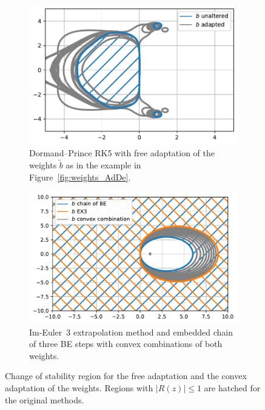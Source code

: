 \documentclass[a4paper]{article}
\numberwithin{equation}{section}
\theoremstyle{plain}
\theoremstyle{definition}
\numberwithin{theorem}{section}
\newcommand{\1}{\mathbbm{1}}
\newcommand{\bt}{\tilde{b}}
\begin{document}
\begin{figure}
     \centering
     \begin{subfigure}[b]{0.45\textwidth}
         \centering
         \includegraphics[width=\textwidth]{plots/stab_dp5.pdf}
         \caption{Dormand--Prince RK5 with free adaptation
                   of the weights $\bt$ as in the example in Figure~\ref{fig:weights_AdDe}.}
         \label{fig:stab_dp5}
     \end{subfigure}
     \hfill
     \begin{subfigure}[b]{0.45\textwidth}
         \centering
         \includegraphics[width=\textwidth]{plots/stab_ex3.pdf}
         \caption{Im-Euler~3 extrapolation method and embedded chain
                  of three BE steps with convex combinations of both
                  weights.}
         \label{fig:stab_ex3}
     \end{subfigure}
        \caption{Change of stability region for the free adaptation and
                 the convex adaptation of the weights.
                 Regions with $|R(z)| \leq 1$ are hatched for the original methods.}
        \label{fig:stab}
\end{figure}
\end{document}
